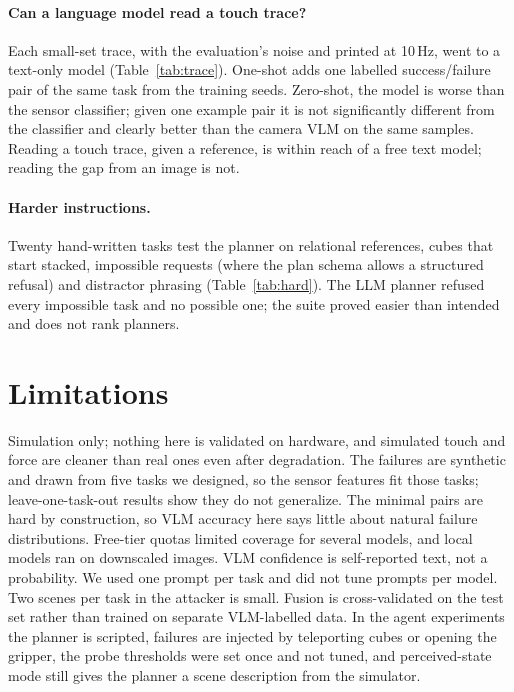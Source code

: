 \documentclass[10pt,twocolumn]{article}
\begin{document}
\paragraph{Can a language model read a touch trace?} Each small-set trace, with the evaluation's noise and printed
at 10\,Hz, went to a text-only model (Table~\ref{tab:trace}). One-shot adds one labelled success/failure pair of the
same task from the training seeds. Zero-shot, the model is worse than the sensor classifier; given one example
pair it is not significantly different from the classifier and clearly better than the camera VLM on the same
samples. Reading a touch trace, given a reference, is within reach of a free text model; reading the gap from an
image is not.
\begin{table}[!htb]\centering\small\resizebox{\columnwidth}{!}{}\caption{A text LLM judging from the sensor trace alone (small set). Last column: McNemar against the sensor classifier.}\label{tab:trace}\end{table}

\paragraph{Harder instructions.} Twenty hand-written tasks test the planner on relational references, cubes that
start stacked, impossible requests (where the plan schema allows a structured refusal) and distractor phrasing
(Table~\ref{tab:hard}). The LLM planner refused every impossible task and no possible one; the suite proved easier
than intended and does not rank planners.
\begin{table}[!htb]\centering\small\resizebox{\columnwidth}{!}{}\caption{Harder suite: correct per family (goal met, or refusal for impossible tasks). Scripted rows plan from the hand-written goal.}\label{tab:hard}\end{table}

\section{Limitations}
Simulation only; nothing here is validated on hardware, and simulated touch and force are cleaner than real ones even after degradation. The failures are synthetic and drawn from five tasks we designed, so the sensor features fit those tasks; leave-one-task-out results show they do not generalize. The minimal pairs are hard by construction, so VLM accuracy here says little about natural failure distributions. Free-tier quotas limited coverage for several models, and local models ran on downscaled images. VLM confidence is self-reported text, not a probability. We used one prompt per task and did not tune prompts per model. Two scenes per task in the attacker is small. Fusion is cross-validated on the test set rather than trained on separate VLM-labelled data. In the agent experiments the planner is scripted, failures are injected by teleporting cubes or opening the gripper, the probe thresholds were set once and not tuned, and perceived-state mode still gives the planner a scene description from the simulator.
\end{document}
